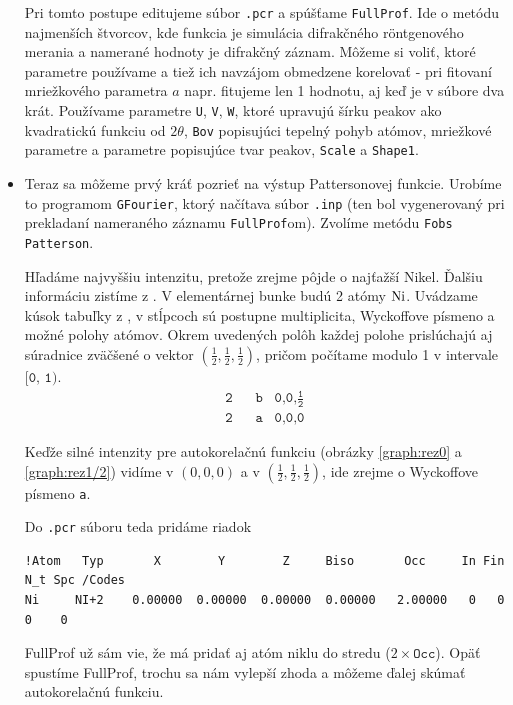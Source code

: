 \documentclass[a4paper, 10pt]{article}
\begin{document}
\begin{itemize}
Pri tomto postupe editujeme súbor \texttt{.pcr} a spúšťame \texttt{FullProf}. Ide o metódu najmenších štvorcov, kde funkcia je simulácia difrakčného r\"ontgenového merania a namerané hodnoty je difrakčný záznam. Môžeme si voliť, ktoré parametre používame a tiež ich navzájom obmedzene korelovať - pri fitovaní mriežkového parametra $a$ napr. fitujeme len 1 hodnotu, aj keď je v súbore dva krát.
Používame parametre \texttt{U}, \texttt{V}, \texttt{W}, ktoré upravujú šírku peakov ako kvadratickú funkciu od $2\theta$, \texttt{Bov} popisujúci tepelný pohyb atómov, mriežkové parametre a parametre popisujúce tvar peakov, \texttt{Scale} a \texttt{Shape1}.


\item Teraz sa môžeme prvý kráť pozrieť na výstup Pattersonovej funkcie. Urobíme to programom \texttt{GFourier}, ktorý načítava súbor \texttt{.inp} (ten bol vygenerovaný pri prekladaní nameraného záznamu \texttt{FullProf}om). Zvolíme metódu \texttt{Fobs Patterson}. 

Hľadáme najvyššiu intenzitu, pretože zrejme pôjde o najťažší Nikel. Ďalšiu informáciu zistíme z \cite{tab}. V elementárnej bunke budú 2 atómy $\ce{Ni}$. Uvádzame kúsok tabuľky z \cite{tab}, v stĺpcoch sú postupne multiplicita, Wyckoffove písmeno a možné polohy atómov. Okrem uvedených polôh každej polohe prislúchajú aj súradnice zväčšené o vektor $(\frac 12,\frac 12,\frac 12)$, pričom počítame modulo 1 v intervale $\texttt{[0, 1)}$.
\begin{align*}
\texttt{2} \;\;\;& \texttt{b} \;\;\;  \texttt{0,0,} \frac {\texttt{1}}{\texttt{2}} \\
\texttt{2} \;\;\;& \texttt{a} \;\;\;  \texttt{0,0,0}
\end{align*}

Keďže silné intenzity pre autokorelačnú funkciu (obrázky \ref{graph:rez0} a \ref{graph:rez1/2}) vidíme v $(0,0,0)$ a v  $(\frac 12,\frac 12,\frac 12)$, ide zrejme o Wyckoffove písmeno \texttt{a}.

Do \texttt{.pcr} súboru teda pridáme riadok 
\begin{verbatim}
!Atom   Typ       X        Y        Z     Biso       Occ     In Fin N_t Spc /Codes
Ni     NI+2    0.00000  0.00000  0.00000  0.00000   2.00000   0   0   0    0  
\end{verbatim}
FullProf už sám vie, že má pridať aj atóm niklu do stredu ($2\times \texttt{Occ}$). 
Opäť spustíme FullProf, trochu sa nám vylepší zhoda a môžeme ďalej skúmať autokorelačnú funkciu.


\end{itemize}
\end{document}
